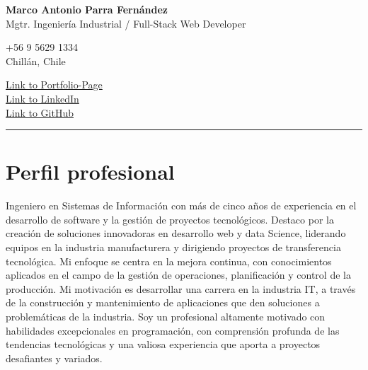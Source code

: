 \documentclass[a4paper,10pt]{article}
\newcommand{\mediumfont}{\fontsize{12pt}{14pt}\selectfont}
\begin{document}
	
	\pagestyle{fancy}


	
	\begin{center}
				\textbf{\LARGE Marco Antonio Parra Fernández} \\
			    {\mediumfont Mgtr. Ingeniería Industrial / Full-Stack Web Developer} \\

				\begin{minipage}[t]{0.45\textwidth}
					\small +56 9 5629 1334 \\
					\small Chillán, Chile \\
				\end{minipage}%
				\hfill
				\begin{minipage}[t]{0.45\textwidth}
					\raggedleft
        			\small \href{https://portfolio-mparraf.herokuapp.com}{Link to Portfolio-Page} \\
					\small \href{https://www.linkedin.com/in/marco-antonio-parra-82999337/}{Link to LinkedIn} \\
					\small \href{https://www.github.com/maaferna}{Link to GitHub}
				\end{minipage}
				\vspace{10pt} %
				\hrule
				\vspace{10pt} %

	\end{center}
	
	\section*{Perfil profesional}
	\small
	Ingeniero en Sistemas de Información con más de cinco años de experiencia en el desarrollo de software y la gestión de proyectos
	tecnológicos. Destaco por la creación de soluciones innovadoras en desarrollo web y data Science, liderando equipos en la
	industria manufacturera y dirigiendo proyectos de transferencia tecnológica. Mi enfoque se centra en la mejora continua, con
	conocimientos aplicados en el campo de la gestión de operaciones, planificación y control de la producción. Mi motivación
	es desarrollar una carrera en la industria IT, a través de la construcción y mantenimiento de aplicaciones que den soluciones a problemáticas de la industria. Soy un profesional altamente motivado con habilidades excepcionales en programación, con comprensión profunda de las tendencias tecnológicas y una valiosa experiencia que aporta a proyectos desafiantes y variados.
	
\end{document}
